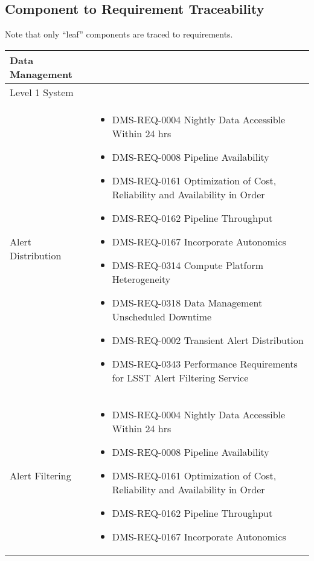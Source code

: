 \subsection{Component to Requirement
Traceability}\label{component-to-requirement-traceability}

Note that only ``leaf'' components are traced to requirements.

\footnotesize
\begin{xtabular}{lp{0.7\textwidth}}
Data Management & \\ \hline
Level 1 System & \\ \hline
Alert Distribution &
\begin{itemize}
\item DMS-REQ-0004 Nightly Data Accessible Within 24 hrs
\item DMS-REQ-0008 Pipeline Availability
\item DMS-REQ-0161 Optimization of Cost, Reliability and Availability in Order
\item DMS-REQ-0162 Pipeline Throughput
\item DMS-REQ-0167 Incorporate Autonomics
\item DMS-REQ-0314 Compute Platform Heterogeneity
\item DMS-REQ-0318 Data Management Unscheduled Downtime
\item DMS-REQ-0002 Transient Alert Distribution
\item DMS-REQ-0343 Performance Requirements for LSST Alert Filtering Service
\end{itemize} \\ \hline
Alert Filtering &
\begin{itemize}
\item DMS-REQ-0004 Nightly Data Accessible Within 24 hrs
\item DMS-REQ-0008 Pipeline Availability
\item DMS-REQ-0161 Optimization of Cost, Reliability and Availability in Order
\item DMS-REQ-0162 Pipeline Throughput
\item DMS-REQ-0167 Incorporate Autonomics

\end{itemize}
\end{xtabular}
